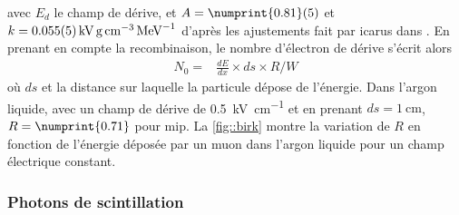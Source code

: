         avec $E_d$ le champ de dérive, et $A=\numprint{0.81}(5)$ et $k=\SI{0.055\pm0.005}{\kilo\volt\gram\per\centi\meter\cubed\per\mega\eV}$ d'après les ajustements fait par \gls{icarus} dans \cite{Amoruso2004}. En prenant en compte la recombinaison, le nombre d'électron de dérive s'écrit alors
        \begin{eqnarray}
          N_0= &\frac{dE}{dx}\times ds \times R/W\label{eq::N0}
        \end{eqnarray}
        où $ds$ et la distance sur laquelle la particule dépose de l'énergie. Dans l'argon liquide, avec un champ de dérive de \SI{0.5}{\kilo\volt\per\centi\meter} et en prenant $ds=\SI{1}{\centi\meter}$, $R=\numprint{0.71}$ pour \gls{mip}. La \autoref{fig::birk} montre la variation de $R$ en fonction de l'énergie déposée par un muon dans l'argon liquide pour un champ électrique constant.

      \subsubsection{Photons de scintillation}
        
